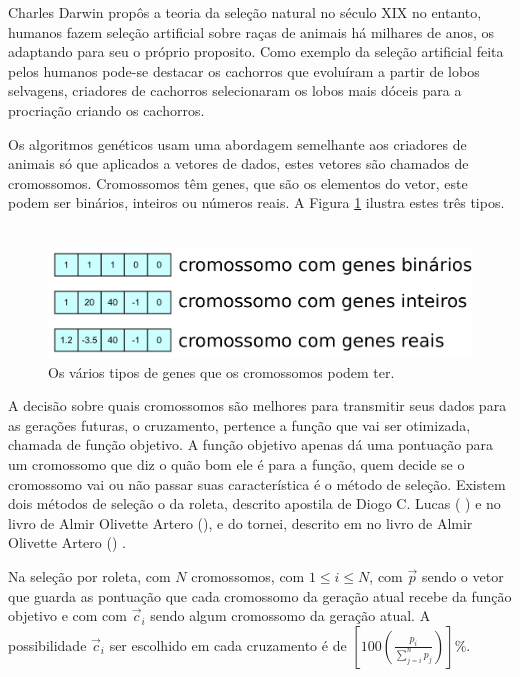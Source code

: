 \documentclass[10pt,a4paper]{article}
\begin{document}
Charles Darwin  propôs a teoria da seleção natural no século XIX no entanto, humanos fazem seleção artificial sobre raças de animais há milhares de anos, os adaptando para seu o próprio proposito. Como exemplo da seleção artificial feita pelos humanos pode-se destacar os cachorros que evoluíram a partir de lobos selvagens, criadores de cachorros selecionaram os lobos mais dóceis para a procriação criando os cachorros.

Os algoritmos genéticos usam uma abordagem semelhante aos criadores de animais só que aplicados a vetores de dados, estes vetores são chamados de cromossomos. Cromossomos têm genes, que são os elementos do vetor, este podem ser binários, inteiros ou números reais. A Figura \ref{fig:ExemploDeVetores} ilustra estes três tipos.\\ \\
\begin{figure}[H]
  \center
  \includegraphics[scale=0.6]{imgs/tiposDeCromossomo.pdf}            
  \caption{Os vários tipos de genes que os cromossomos podem ter.}
  \label{fig:ExemploDeVetores}
\end{figure} 

A decisão sobre quais cromossomos são melhores para transmitir seus dados para as gerações futuras, o cruzamento, pertence a função que vai ser otimizada, chamada de função objetivo. A função objetivo apenas dá uma pontuação para um cromossomo que diz o quão bom ele é para a função, quem decide se o cromossomo vai ou não passar suas característica é o método de seleção. Existem dois métodos de seleção o da roleta, descrito apostila de  Diogo C. Lucas ( \cite{UFRGS-Apostila-GA}) e no livro de Almir Olivette Artero (\cite{Livro-De-IA}), e do tornei, descrito em   no livro de  Almir Olivette Artero (\cite{Livro-De-IA}) .

 Na seleção por roleta, com $N$ cromossomos, com $1 \le i \le N$, com $\vec{p}$ sendo o vetor que guarda as pontuação que cada cromossomo da geração atual recebe da função objetivo e com com $\vec{c}_i$ sendo algum cromossomo da geração atual. A possibilidade  $\vec{c}_i$ ser escolhido em cada cruzamento é de $\left [100 \left ( \frac{p_{i}}{\sum \limits_{j=i}^{n} p_{j}}\right ) \right ]\%$. 
 
\end{document}
